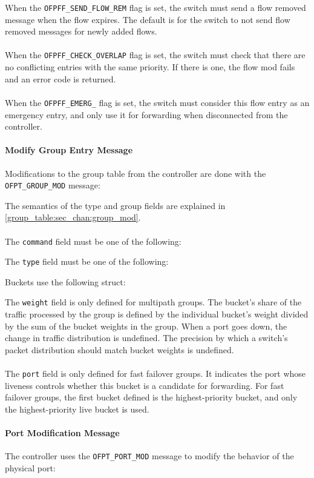 
When the \verb|OFPFF_SEND_FLOW_REM| flag is set, the switch must send a flow removed message when the flow expires.  The default is for the switch to not send flow removed messages for newly added flows.  
\\\\
When the \verb|OFPFF_CHECK_OVERLAP| flag is set, the switch must check that there are no conflicting entries with the same priority. If there is one, the flow mod fails and an error code is returned.
\\\\
When the \verb|OFPFF_EMERG_| flag is set, the switch must consider this flow entry as an emergency entry, and only use it for forwarding when disconnected from the controller.

\paragraph{Modify Group Entry Message}
Modifications to the group table from the controller are done with the \verb|OFPT_GROUP_MOD| message:


The semantics of the type and group fields are explained in \ref{group_table:sec_chan:group_mod}.
\\\\
The \verb|command| field must be one of the following:


The \verb|type| field must be one of the following:


Buckets use the following struct:


The \verb|weight| field is only defined for multipath groups.  The bucket's share of the traffic processed by the group is defined by the individual bucket's weight divided by the sum of the bucket weights in the group.  When a port goes down, the change in traffic distribution is undefined.  The precision by which a switch's packet distribution should match bucket weights is undefined.
\\\\
The \verb|port| field is only defined for fast failover groups.  It indicates the port whose liveness controls whether this bucket is a candidate for forwarding.  For fast failover groups, the first bucket defined is the highest-priority bucket, and only the highest-priority live bucket is used.

\paragraph{Port Modification Message}
The controller uses the \verb|OFPT_PORT_MOD| message to modify the behavior of the physical port:

